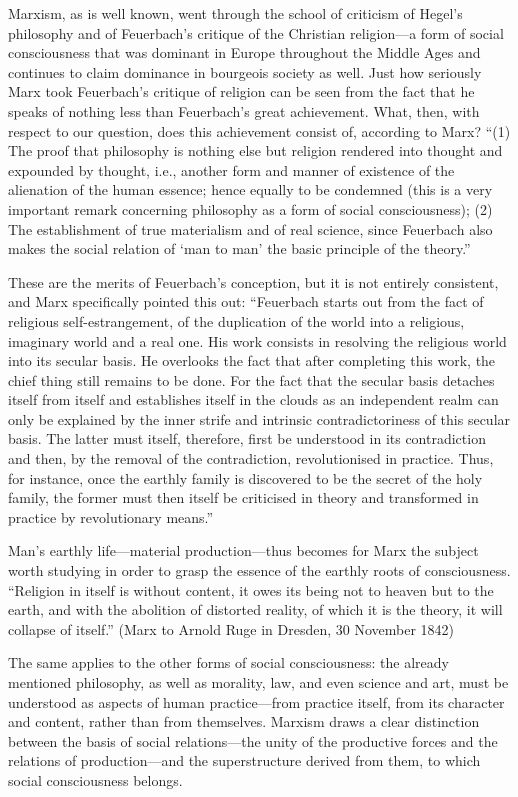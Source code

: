 \documentclass[../main]{subfiles}
\begin{document}
Marxism, as is well known, went through the school of criticism of Hegel's philosophy and of Feuerbach's critique of the Christian religion—a form of social consciousness that was dominant in Europe throughout the Middle Ages and continues to claim dominance in bourgeois society as well. Just how seriously Marx took Feuerbach's critique of religion can be seen from the fact that he speaks of nothing less than Feuerbach's great achievement. What, then, with respect to our question, does this achievement consist of, according to Marx? “(1) The proof that philosophy is nothing else but religion rendered into thought and expounded by thought, i.e., another form and manner of existence of the alienation of the human essence; hence equally to be condemned (this is a very important remark concerning philosophy as a form of social consciousness); (2) The establishment of true materialism and of real science, since Feuerbach also makes the social relation of ‘man to man’ the basic principle of the theory.”

These are the merits of Feuerbach's conception, but it is not entirely consistent, and Marx specifically pointed this out: “Feuerbach starts out from the fact of religious self-estrangement, of the duplication of the world into a religious, imaginary world and a real one. His work consists in resolving the religious world into its secular basis. He overlooks the fact that after completing this work, the chief thing still remains to be done. For the fact that the secular basis detaches itself from itself and establishes itself in the clouds as an independent realm can only be explained by the inner strife and intrinsic contradictoriness of this secular basis. The latter must itself, therefore, first be understood in its contradiction and then, by the removal of the contradiction, revolutionised in practice. Thus, for instance, once the earthly family is discovered to be the secret of the holy family, the former must then itself be criticised in theory and transformed in practice by revolutionary means.”

Man’s earthly life—material production—thus becomes for Marx the subject worth studying in order to grasp the essence of the earthly roots of consciousness. “Religion in itself is without content, it owes its being not to heaven but to the earth, and with the abolition of distorted reality, of which it is the theory, it will collapse of itself.” (Marx to Arnold Ruge in Dresden, 30 November 1842)

The same applies to the other forms of social consciousness: the already mentioned philosophy, as well as morality, law, and even science and art, must be understood as aspects of human practice—from practice itself, from its character and content, rather than from themselves. Marxism draws a clear distinction between the basis of social relations—the unity of the productive forces and the relations of production—and the superstructure derived from them, to which social consciousness belongs.
\end{document}
